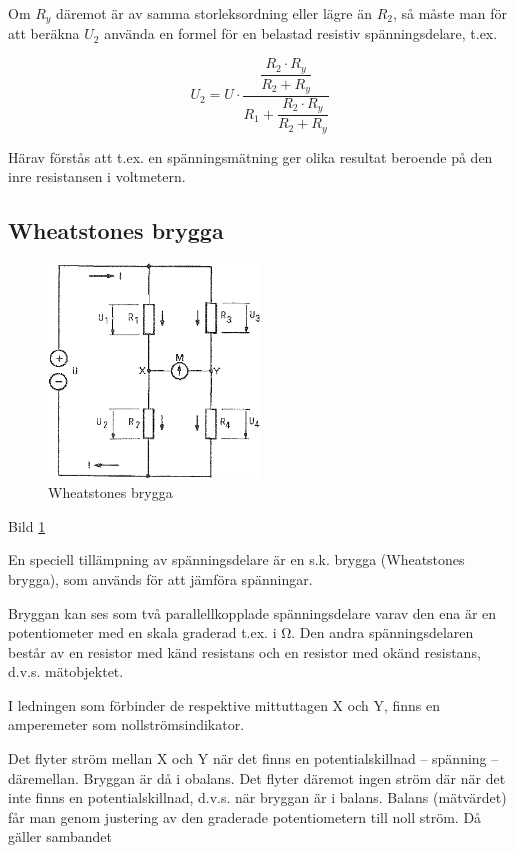 Om \(R_y\) däremot är av samma storleksordning eller lägre än \(R_2\), så måste
man för att beräkna \(U_2\) använda en formel för en belastad resistiv
spänningsdelare, t.ex.

\[
U_2 = U \cdot \dfrac{ \dfrac{R_2 \cdot R_y}{R_2 + R_y} }{ R_1 + \dfrac{R_2 \cdot R_y}{R_2 + R_y} }
\]

Härav förstås att t.ex. en spänningsmätning ger olika resultat beroende på den
inre resistansen i voltmetern.

\subsection{Wheatstones brygga}

\begin{figure}
\includegraphics[width=0.5\textwidth]{images/bild_2_3-04.png}
\caption{Wheatstones brygga}
\label{fig:BildII3-04}
\end{figure}

Bild \ref{fig:BildII3-04}

En speciell tillämpning av spänningsdelare är en s.k. brygga (Wheatstones
brygga), som används för att jämföra spänningar.

Bryggan kan ses som två parallellkopplade spänningsdelare varav den ena är en
potentiometer med en skala graderad t.ex. i Ω. Den andra spänningsdelaren består
av en resistor med känd resistans och en resistor med okänd resistans, d.v.s.
mätobjektet.

I ledningen som förbinder de respektive mittuttagen X och Y, finns en
amperemeter som nollströmsindikator.


Det flyter ström mellan X och Y när det finns en potentialskillnad -- spänning
-- däremellan.
Bryggan är då i obalans. Det flyter däremot ingen ström där när det
inte finns en potentialskillnad, d.v.s. när bryggan är i balans. Balans
(mätvärdet) får man genom justering av den graderade potentiometern till noll
ström. Då gäller sambandet

